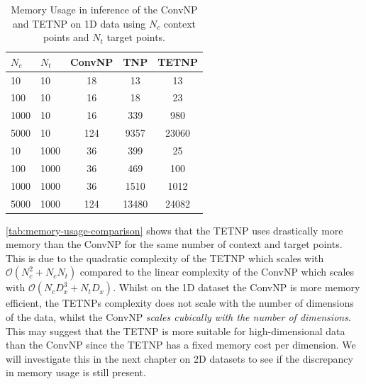 \documentclass[../../main.tex]{subfiles}
\begin{document}
\begin{table}[H]
	\centering
	\begin{tabular}{@{}llccc@{}}
	\toprule
	$N_c$ & $N_t$ & ConvNP  & TNP   & TETNP \\ \midrule
	10    & 10    & 18                 & 13               &  13\\
	100   & 10    & 16                 & 18               &  23\\
	1000  & 10    & 16                 & 339              &  980 \\
	5000  & 10    & 124                & 9357             &  23060\\ \midrule
	10    & 1000  & 36                 & 399              &  25\\
	100   & 1000  & 36                 & 469              &  100\\
	1000  & 1000  & 36                 & 1510             &  1012\\
	5000  & 1000  & 124                & 13480            &  24082\\ \bottomrule
	\end{tabular}
	\caption{Memory Usage in inference of the ConvNP and TETNP on 1D data using $N_c$ context points and $N_t$ target points.}
	\label{tab:memory-usage-comparison}
\end{table}

\autoref{tab:memory-usage-comparison} shows that the TETNP uses drastically more memory than the ConvNP for the same number of context and target points. This is due to the quadratic complexity of the TETNP which scales with $\mathcal{O}(N_c^2 + N_cN_t)$ compared to the linear complexity of the ConvNP which scales with $\mathcal{O}(N_cD_x^3 + N_tD_x)$. Whilst on the 1D dataset the ConvNP is more memory efficient, the TETNPs complexity does not scale with the number of dimensions of the data, whilst the ConvNP \emph{scales cubically with the number of dimensions}. This may suggest that the TETNP is more suitable for high-dimensional data than the ConvNP since the TETNP has a fixed memory cost per dimension. We will investigate this in the next chapter on 2D datasets to see if the discrepancy in memory usage is still present.

\ifSubfilesClassLoaded{%
    \printbibliography{}
}{} 
\end{document}
